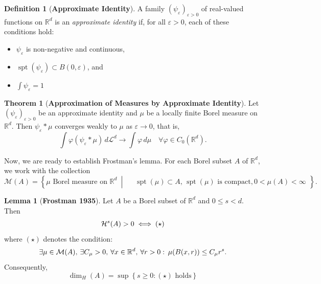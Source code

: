 \documentclass[12pt,a4paper]{report}
\theoremstyle{definition}
\newtheorem{lemma}{Lemma}
\newtheorem{theorem}{Theorem}
\newtheorem{definition}{Definition}
\begin{document}
\begin{definition}[\textbf{Approximate Identity}]
A family \( ( \psi_\varepsilon )_{\varepsilon > 0} \) of real-valued functions on \( \mathbb{R}^d \) is an \emph{approximate identity} if, for all \( \varepsilon > 0 \), each of these conditions hold:
\begin{itemize}
    \item $\psi_\varepsilon$ is non-negative and continuous,
    \item $\operatorname{spt} (\psi_\varepsilon) \subset B(0, \varepsilon)$, and
    \item $\int \psi_\varepsilon = 1 $
\end{itemize}
\end{definition}

\begin{theorem}[\textbf{Approximation of Measures by Approximate Identity}]
Let \( ( \psi_\varepsilon )_{\varepsilon > 0} \) be an approximate identity and \( \mu \) be a locally finite Borel measure on \( \mathbb{R}^d \). Then \( \psi_\varepsilon * \mu \) converges weakly to \( \mu \) as \( \varepsilon \to 0 \), that is,
\[
\int \varphi(\psi_\varepsilon * \mu) \, d\mathcal{L}^d \to \int \varphi \, d\mu
\quad \forall \varphi \in C_0(\mathbb{R}^d).
\]
\end{theorem}


\medskip

Now, we are ready to establish Frostman's lemma. For each Borel subset $A$ of $\mathbb{R}^d$, we work with the collection
\[
\mathcal{M}(A) = \left\{
    \mu \text{ Borel measure on } \mathbb{R}^d \ \middle| \
    \begin{aligned}
        &\operatorname{spt}(\mu) \subset A \text{, } \operatorname{spt}(\mu) \text{  is compact}, 0 < \mu(A) < \infty
    \end{aligned}
\right\}.
\]

\begin{lemma}[\textbf{Frostman 1935}] \label{eq:Frost}
Let \( A \) be a Borel subset of \( \mathbb{R}^d \) and \( 0 \leq s < d \). Then
\begin{equation}
\mathcal{H}^s(A) > 0  \iff (\star) \notag
\end{equation}
where \( (\star) \) denotes the condition:
$$
\exists \mu \in \mathcal{M}(A), \hspace{0.07cm}  \exists C_\mu > 0, \hspace{0.07cm} \forall x \in \mathbb{R}^d, \hspace{0.07cm} \forall r > 0: \hspace{0.07cm} \mu(B(x, r)) \le C_\mu r^s.
$$
Consequently,
$$\dim_H(A) = \sup \left\{ s \geq 0 : (\star) \text{ holds} \right\}$$
\end{lemma}
\end{document}
